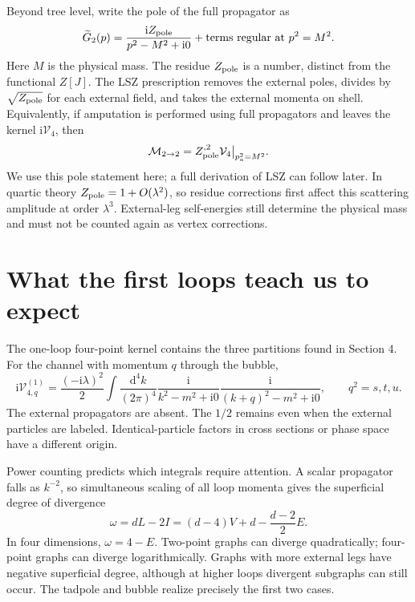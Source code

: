 \documentclass[11pt]{article}
\newcommand{\dd}{\mathrm d}
\newcommand{\ii}{\mathrm i}
\newcommand{\module}[1]{\clearpage\section{#1}}
\begin{document}
Beyond tree level, write the pole of the full propagator as
\begin{equation}
 \widetilde G_2(p)=\frac{\ii Z_{\rm pole}}{p^2-M^2+\ii0}
 +\text{terms regular at }p^2=M^2.                 \label{eq:pole}
\end{equation}
Here \(M\) is the physical mass. The residue \(Z_{\rm pole}\) is a
number, distinct from the functional \(Z[J]\). The LSZ prescription
removes the external poles, divides by \(\sqrt{Z_{\rm pole}}\) for each
external field, and takes the external momenta on shell. Equivalently,
if amputation is performed using full propagators and leaves the
kernel \(\ii\mathcal V_4\), then
\begin{equation}
 \mathcal M_{2\to2}=Z_{\rm pole}^{,2}
 \mathcal V_4\big|_{p_a^2=M^2}.                    \label{eq:LSZbrief}
\end{equation}
We use this pole statement here; a full derivation of LSZ can follow
later. In quartic theory \(Z_{\rm pole}=1+O(\lambda^2)\), so residue
corrections first affect this scattering amplitude at order \(\lambda^3\).
External-leg self-energies still determine the physical mass and must
not be counted again as vertex corrections.

\module{What the first loops teach us to expect}
The one-loop four-point kernel contains the three partitions found in
Section 4. For the channel with momentum \(q\) through the bubble,
\begin{equation}
 \ii\mathcal V_{4,q}^{(1)}=
 \frac{(-\ii\lambda)^2}{2}\int\frac{\dd^4k}{(2\pi)^4}
 \frac{\ii}{k^2-m^2+\ii0}
 \frac{\ii}{(k+q)^2-m^2+\ii0},\qquad q^2=s,t,u.
 \label{eq:bubble}
\end{equation}
The external propagators are absent. The \(1/2\) remains even when
the external particles are labeled. Identical-particle factors in
cross sections or phase space have a different origin.

Power counting predicts which integrals require attention. A scalar
propagator falls as \(k^{-2}\), so simultaneous scaling of all loop
momenta gives the superficial degree of divergence
\begin{equation}
 \omega=dL-2I=(d-4)V+d-\frac{d-2}{2}E.
\end{equation}
In four dimensions, \(\omega=4-E\). Two-point graphs can diverge
quadratically; four-point graphs can diverge logarithmically. Graphs
with more external legs have negative superficial degree, although
at higher loops divergent subgraphs can still occur. The tadpole and
bubble realize precisely the first two cases.
\end{document}
